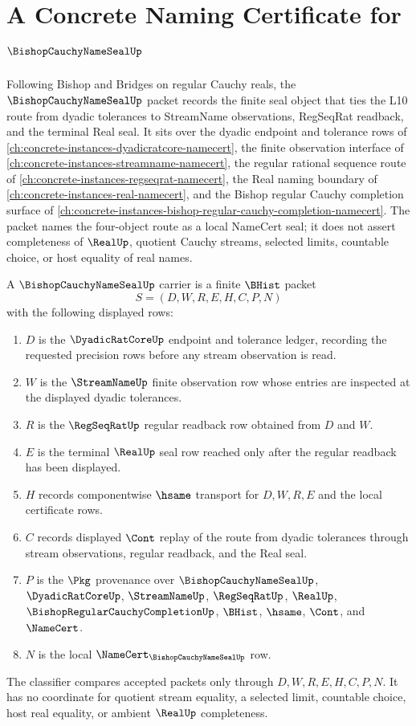 \chapter{A Concrete Naming Certificate for $\BishopCauchyNameSealUp$}
\label{ch:concrete-instances-bishop-cauchy-name-seal-namecert}

Following Bishop and Bridges on regular Cauchy reals, the $\BishopCauchyNameSealUp$ packet records the finite seal object that ties the L10 route from dyadic tolerances to StreamName observations, RegSeqRat readback, and the terminal Real seal. It sits over the dyadic endpoint and tolerance rows of \autoref{ch:concrete-instances-dyadicratcore-namecert}, the finite observation interface of \autoref{ch:concrete-instances-streamname-namecert}, the regular rational sequence route of \autoref{ch:concrete-instances-regseqrat-namecert}, the Real naming boundary of \autoref{ch:concrete-instances-real-namecert}, and the Bishop regular Cauchy completion surface of \autoref{ch:concrete-instances-bishop-regular-cauchy-completion-namecert}. The packet names the four-object route as a local NameCert seal; it does not assert completeness of $\RealUp$, quotient Cauchy streams, selected limits, countable choice, or host equality of real names.

\begin{definition}
\label{def:bishop-cauchy-name-seal-carrier}
A $\BishopCauchyNameSealUp$ carrier is a finite $\BHist$ packet
$$
S=(D,W,R,E,H,C,P,N)
$$
with the following displayed rows:
\begin{enumerate}
\item $D$ is the $\DyadicRatCoreUp$ endpoint and tolerance ledger, recording the requested precision rows before any stream observation is read.
\item $W$ is the $\StreamNameUp$ finite observation row whose entries are inspected at the displayed dyadic tolerances.
\item $R$ is the $\RegSeqRatUp$ regular readback row obtained from $D$ and $W$.
\item $E$ is the terminal $\RealUp$ seal row reached only after the regular readback has been displayed.
\item $H$ records componentwise $\hsame$ transport for $D,W,R,E$ and the local certificate rows.
\item $C$ records displayed $\Cont$ replay of the route from dyadic tolerances through stream observations, regular readback, and the Real seal.
\item $P$ is the $\Pkg$ provenance over $\BishopCauchyNameSealUp$, $\DyadicRatCoreUp$, $\StreamNameUp$, $\RegSeqRatUp$, $\RealUp$, $\BishopRegularCauchyCompletionUp$, $\BHist$, $\hsame$, $\Cont$, and $\NameCert$.
\item $N$ is the local $\NameCert_{\BishopCauchyNameSealUp}$ row.
\end{enumerate}
The classifier compares accepted packets only through $D,W,R,E,H,C,P,N$. It has no coordinate for quotient stream equality, a selected limit, countable choice, host real equality, or ambient $\RealUp$ completeness.
\end{definition}

